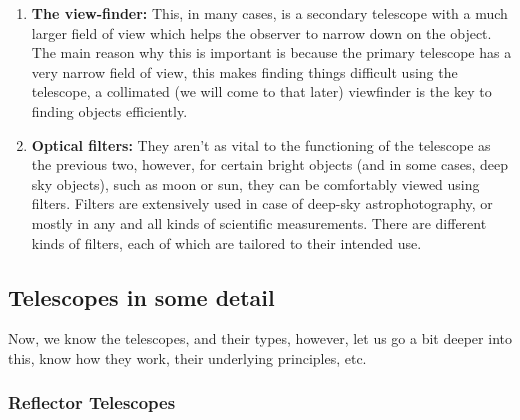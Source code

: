 \documentclass[a4paper,twoside,11pt]{article}
\numberwithin{equation}{section}
\begin{document}
\begin{enumerate}
{\begin{enumerate}
\item \textbf{The view-finder:} This, in many cases, is a secondary telescope with a much larger field of view which helps the observer to narrow down on the object. The main reason why this is important is because the primary telescope has a very narrow field of view, this makes finding things difficult using the telescope, a collimated (we will come to that later) viewfinder is the key to finding objects efficiently. 

\item \textbf{Optical filters:} They aren't as vital to the functioning of the telescope as the previous two, however, for certain bright objects (and in some cases, deep sky objects), such as moon or sun, they can be comfortably viewed using filters. Filters are extensively used in case of deep-sky astrophotography, or mostly in any and all kinds of scientific measurements. There are different kinds of filters, each of which are tailored to their intended use.  
\end{enumerate}
}
\end{enumerate}
\newpage
\subsection{Telescopes in some detail}
Now, we know the telescopes, and their types, however, let us go a bit deeper into this, know how they work, their underlying principles, etc.
\subsubsection{Reflector Telescopes}
\end{document}
